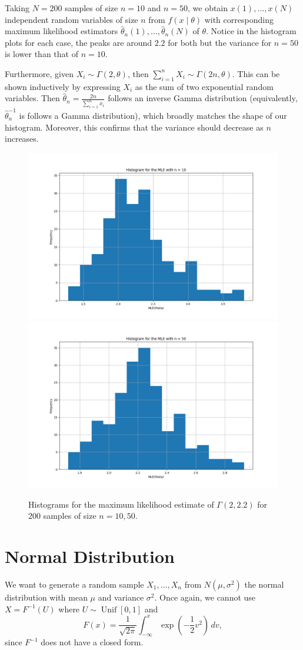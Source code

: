\documentclass{article}
\begin{document}
Taking \(N = 200\) samples of size \(n = 10\) and \(n = 50\), we obtain \(x(1), \dots, x(N)\) independent random variables of size \(n\) from \(f(x \mid \theta)\) with corresponding maximum likelihood estimators \(\hat{\theta}_n(1), \dots, \hat{\theta}_n(N)\) of \(\theta\). Notice in the histogram plots for each case, the peaks are around \(2.2\) for both but the variance for \(n = 50\) is lower than that of \(n = 10\). 

Furthermore, given \(X_i \sim \Gamma(2, \theta)\), then \(\sum_{i=1}^n X_i \sim \Gamma(2n, \theta)\). This can be shown inductively by expressing \(X_i\) as the sum of two exponential random variables. Then \(\hat{\theta}_n = \frac{2n}{\sum_{i=1}^n x_i}\) follows an inverse Gamma distribution (equivalently, \(\hat{\theta}_n^{-1}\) is follows a Gamma distribution), which broadly matches the shape of our histogram. Moreover, this confirms that the variance should decrease as \(n\) increases.

\begin{figure}
    \centering
    \includegraphics[width=0.49\linewidth]{images/gamma_hist_10.png}
    \includegraphics[width=0.49\linewidth]{images/gamma_hist_50.png}
    \caption{Histograms for the maximum likelihood estimate of \(\Gamma(2, 2.2)\) for \(200\) samples of size \(n = 10, 50\).}
\end{figure}

\section{Normal Distribution}

We want to generate a random sample \(X_1,\dots,X_n\) from \(N(\mu,\sigma^2)\) the normal distribution with mean \(\mu\) and variance \(\sigma^2\). Once again, we cannot use \(X = F^{-1}(U)\) where \(U \sim \mathop{\mathrm{Unif}}[0,1]\) and
\[ F(x) = \frac{1}{\sqrt{2\pi}}\int_{-\infty}^x \exp\left(-\frac{1}{2}v^2\right)\,dv, \]
since \(F^{-1}\) does not have a closed form. 
\end{document}
